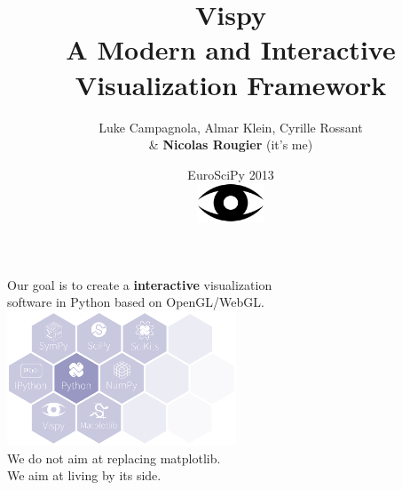 \documentclass[10pt]{beamer}
\title{Vispy\\
{\small A Modern and Interactive Visualization Framework}}
\author{Luke Campagnola, Almar Klein, Cyrille Rossant\\ \& {\bf Nicolas Rougier} (it's me)}
\date{EuroSciPy 2013\\
\includegraphics[width=0.15\textwidth]{vispy-logo}}
\begin{document}
\begin{frame}
  \titlepage
\end{frame}

\begin{frame}
  \frametitle{}
  \begin{block}{}
    \begin{center}
      Our goal is to create a {\bf interactive} visualization\\ software in
      Python based on OpenGL/WebGL.\\
      \vspace{2.5mm}
      \includegraphics[height=4cm]{vispy}\\
      \vspace{2.5mm}
      We do not aim at replacing matplotlib.\\
      We aim at living by its side.\\
    \end{center}
  \end{block}
\end{frame}
\end{document}
